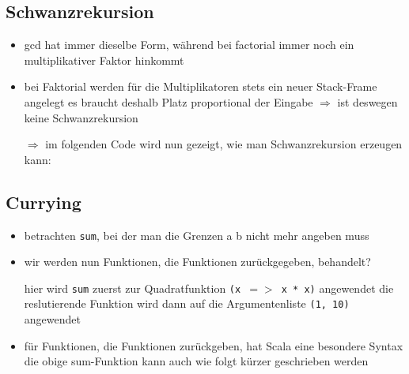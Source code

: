 \subsection{Schwanzrekursion}






\begin{itemize}
  \item gcd hat immer dieselbe Form, während bei factorial immer noch ein
  multiplikativer Faktor hinkommt
  \item bei Faktorial werden für die Multiplikatoren stets ein neuer
  Stack-Frame angelegt \und es braucht deshalb Platz proportional der
  Eingabe $\Rightarrow$ ist deswegen keine Schwanzrekursion
  
  $\Rightarrow$ im folgenden Code wird nun gezeigt, wie man Schwanzrekursion
  erzeugen kann:
  
  
\end{itemize}


\subsection{Currying}
\begin{itemize}
  \item betrachten \texttt{sum}, bei der man die Grenzen a \und b nicht mehr
  angeben muss
  
  
  
  \item wir werden nun Funktionen, die Funktionen zurückgegeben,
  behandelt?
  
  
  
  hier wird \texttt{sum} zuerst zur Quadratfunktion \texttt{(x $=>$ x * x)}
  angewendet \und die reslutierende Funktion wird dann auf die Argumentenliste
  \texttt{(1, 10)} angewendet
  \item für Funktionen, die Funktionen zurückgeben, hat Scala eine besondere
  Syntax \und die obige sum-Funktion kann auch wie folgt kürzer geschrieben
  werden
  
  
  
\end{itemize}

